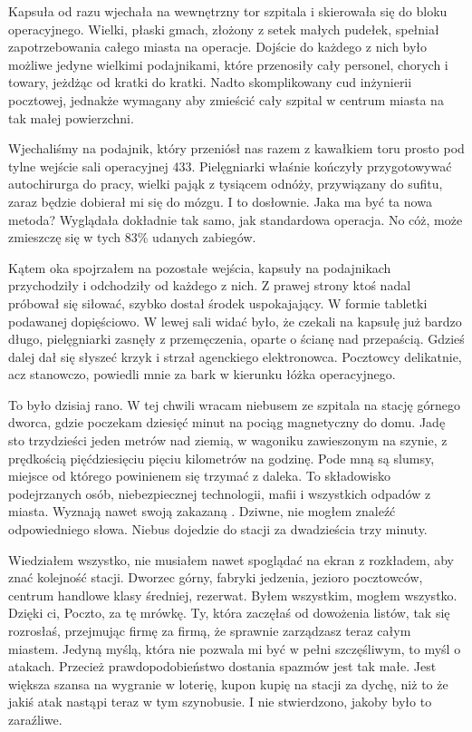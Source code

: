 Kapsuła od razu wjechała na wewnętrzny tor szpitala i skierowała się do bloku operacyjnego. 
Wielki, płaski gmach, złożony z setek małych pudełek, spełniał zapotrzebowania całego miasta na operacje.
Dojście do każdego z nich było możliwe jedyne wielkimi podajnikami, które przenosiły cały personel, chorych i towary, jeżdżąc od kratki do kratki.
Nadto skomplikowany cud inżynierii pocztowej, jednakże wymagany aby zmieścić cały szpital w centrum miasta na tak małej powierzchni.

Wjechaliśmy na podajnik, który przeniósł nas razem z kawałkiem toru prosto pod tylne wejście sali operacyjnej 433.
Pielęgniarki właśnie kończyły przygotowywać autochirurga do pracy, wielki pająk z tysiącem odnóży, przywiązany do sufitu, zaraz będzie dobierał mi się do mózgu. I to dosłownie.
Jaka ma być ta nowa metoda? Wyglądała dokładnie tak samo, jak standardowa operacja. No cóż, może zmieszczę się w tych 83\% udanych zabiegów.

Kątem oka spojrzałem na pozostałe wejścia, kapsuły na podajnikach przychodziły i odchodziły od każdego z nich.
Z prawej strony ktoś nadal próbował się siłować, szybko dostał środek uspokajający. W formie tabletki podawanej dopięściowo.
W lewej sali widać było, że czekali na kapsułę już bardzo długo, pielęgniarki zasnęły z przemęczenia, oparte o ścianę nad przepaścią.
Gdzieś dalej dał się słyszeć krzyk i strzał agenckiego elektronowca.
Pocztowcy delikatnie, acz stanowczo, powiedli mnie za bark w kierunku łóżka operacyjnego.

\divider{}

To było dzisiaj rano. W tej chwili wracam niebusem ze szpitala na stację górnego dworca, gdzie poczekam dziesięć minut na pociąg magnetyczny do domu.
Jadę sto trzydzieści jeden metrów nad ziemią, w wagoniku zawieszonym na szynie, z prędkością pięćdziesięciu pięciu kilometrów na godzinę. 
Pode mną są slumsy, miejsce od którego powinienem się trzymać z daleka. 
To składowisko podejrzanych osób, niebezpiecznej technologii, mafii i wszystkich odpadów z miasta.
Wyznają nawet swoją zakazaną \censor{}.
Dziwne, nie mogłem znaleźć odpowiedniego słowa.
Niebus dojedzie do stacji za dwadzieścia trzy minuty.

Wiedziałem wszystko, nie musiałem nawet spoglądać na ekran z rozkładem, aby znać kolejność stacji.
Dworzec górny, fabryki jedzenia, jezioro pocztowców, centrum handlowe klasy średniej, rezerwat.
Byłem wszystkim, mogłem wszystko. 
Dzięki ci, Poczto, za tę mrówkę. Ty, która zaczęłaś od dowożenia listów, tak się rozrosłaś, przejmując firmę za firmą, że sprawnie zarządzasz teraz całym miastem.
Jedyną myślą, która nie pozwala mi być w pełni szczęśliwym, to myśl o atakach. Przecież prawdopodobieństwo dostania spazmów jest tak małe.
Jest większa szansa na wygranie w loterię, kupon kupię na stacji za dychę, niż to że jakiś atak nastąpi teraz w tym szynobusie.
I nie stwierdzono, jakoby było to zaraźliwe.

